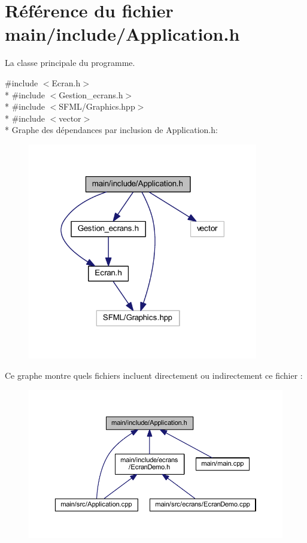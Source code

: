 \section{Référence du fichier main/include/\+Application.h}
\label{_application_8h}


La classe principale du programme.  


{\ttfamily \#include $<$Ecran.\+h$>$}\\*
{\ttfamily \#include $<$Gestion\+\_\+ecrans.\+h$>$}\\*
{\ttfamily \#include $<$S\+F\+M\+L/\+Graphics.\+hpp$>$}\\*
{\ttfamily \#include $<$vector$>$}\\*
Graphe des dépendances par inclusion de Application.\+h\+:\nopagebreak
\begin{figure}[H]
\begin{center}
\leavevmode
\includegraphics[width=285pt]{_application_8h__incl}
\end{center}
\end{figure}
Ce graphe montre quels fichiers incluent directement ou indirectement ce fichier \+:\nopagebreak
\begin{figure}[H]
\begin{center}
\leavevmode
\includegraphics[width=350pt]{_application_8h__dep__incl}
\end{center}
\end{figure}
